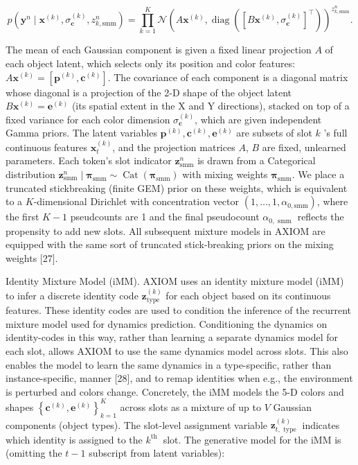 \documentclass[10pt]{article}
\begin{document}
\begin{equation*}
p\left(\mathbf{y}^{n} \mid \mathbf{x}^{(k)}, \sigma_{\mathbf{c}}^{(k)}, z_{k, \mathrm{smm}}^{n}\right)=\prod_{k=1}^{K} \mathcal{N}\left(A \mathbf{x}^{(k)}, \operatorname{diag}\left(\left[B \mathbf{x}^{(k)}, \sigma_{\mathbf{c}}^{(k)}\right]^{\top}\right)\right)^{z_{k, \mathrm{smm}}^{n}} . \tag{2}
\end{equation*}


The mean of each Gaussian component is given a fixed linear projection $A$ of each object latent, which selects only its position and color features: $A \mathbf{x}^{(k)}=\left[\mathbf{p}^{(k)}, \mathbf{c}^{(k)}\right]$. The covariance of each component is a diagonal matrix whose diagonal is a projection of the 2-D shape of the object latent $B \mathbf{x}^{(k)}=\mathbf{e}^{(k)}$ (its spatial extent in the X and Y directions), stacked on top of a fixed variance for each color dimension $\sigma_{\mathbf{c}}^{(k)}$, which are given independent Gamma priors. The latent variables $\mathbf{p}^{(k)}, \mathbf{c}^{(k)}, \mathbf{e}^{(k)}$ are subsets of slot $k$ 's full continuous features $\mathbf{x}_{t}^{(k)}$, and the projection matrices $A$, $B$ are fixed, unlearned parameters. Each token's slot indicator $\mathbf{z}_{\mathrm{smm}}^{n}$ is drawn from a Categorical distribution $\mathbf{z}_{\mathrm{smm}}^{n} \mid \boldsymbol{\pi}_{\mathrm{smm}} \sim \operatorname{Cat}\left(\boldsymbol{\pi}_{\mathrm{smm}}\right)$ with mixing weights $\boldsymbol{\pi}_{\mathrm{smm}}$. We place a truncated stickbreaking (finite GEM) prior on these weights, which is equivalent to a $K$-dimensional Dirichlet with concentration vector $\left(1, \ldots, 1, \alpha_{0, \mathrm{smm}}\right)$, where the first $K-1$ pseudcounts are 1 and the final pseudocount $\alpha_{0, \text { smm }}$ reflects the propensity to add new slots. All subsequent mixture models in AXIOM are equipped with the same sort of truncated stick-breaking priors on the mixing weights [27].

Identity Mixture Model (iMM). AXIOM uses an identity mixture model (iMM) to infer a discrete identity code $\mathbf{z}_{\text {type }}^{(k)}$ for each object based on its continuous features. These identity codes are used to condition the inference of the recurrent mixture model used for dynamics prediction. Conditioning the dynamics on identity-codes in this way, rather than learning a separate dynamics model for each slot, allows AXIOM to use the same dynamics model across slots. This also enables the model to learn the same dynamics in a type-specific, rather than instance-specific, manner [28], and to remap identities when e.g., the environment is perturbed and colors change. Concretely, the iMM models the 5-D colors and shapes $\left\{\mathbf{c}^{(k)}, \mathbf{e}^{(k)}\right\}_{k=1}^{K}$ across slots as a mixture of up to $V$ Gaussian components (object types). The slot-level assignment variable $\mathbf{z}_{t, \text { type }}^{(k)}$ indicates which identity is assigned to the $k^{\text {th }}$ slot. The generative model for the iMM is (omitting the $t-1$ subscript from latent variables):
\end{document}
